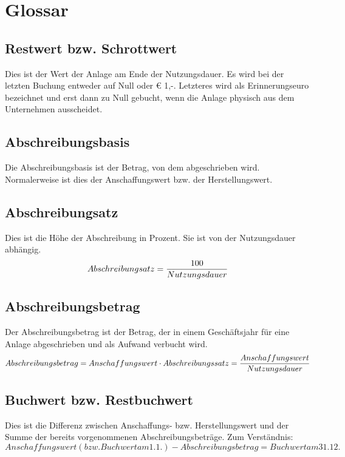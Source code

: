 \documentclass[a4paper,10pt]{report}
\begin{document}
\chapter{Glossar}
\label{chap:glossar}
\thispagestyle{fancy}
\section{Restwert bzw. Schrottwert}
\label{sec:restwert}
Dies ist der Wert der Anlage am Ende der Nutzungsdauer. Es wird bei
der letzten Buchung entweder auf Null oder \euro{} 1,-. Letzteres wird
als Erinnerungseuro bezeichnet und erst dann zu Null gebucht, wenn die
Anlage physisch aus dem Unternehmen ausscheidet.

\section{Abschreibungsbasis}
Die Abschreibungsbasis ist der Betrag, von dem abgeschrieben
wird. Normalerweise ist dies der Anschaffungswert bzw. der
Herstellungswert.

\section{Abschreibungsatz}
Dies ist die Höhe der Abschreibung in Prozent. Sie ist von der
Nutzungsdauer abhängig.
\begin{equation}
  Abschreibungsatz = { 100 \over Nutzungsdauer}
\end{equation}

\section{Abschreibungsbetrag}
Der Abschreibungsbetrag ist der Betrag, der in einem Geschäftsjahr für
eine Anlage abgeschrieben und als Aufwand verbucht wird.
\begin{equation}
  Abschreibungsbetrag = Anschaffungswert \cdot Abschreibungssatz = {
Anschaffungswert \over Nutzungsdauer }
\end{equation}

\section{Buchwert bzw. Restbuchwert}
\label{sec:buchwert}
Dies ist die Differenz zwischen Anschaffungs- bzw. Herstellungswert
und der Summe der bereits vorgenommenen Abschreibungsbeträge. Zum
Verständnis:
\begin{equation}
  Anschaffungswert (bzw. Buchwert am 1.1.) - Abschreibungsbetrag =
Buchwert am 31.12.
\end{equation}
\end{document}
